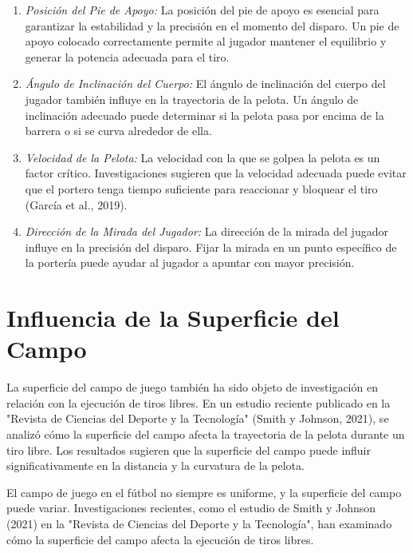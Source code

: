 \documentclass[
    a4paper,%
    DIV=calc,%
    abstract=true%
  ]{scrartcl}%
\begin{document}
  \begin{enumerate}
  \def\labelenumi{\arabic{enumi}.}
  \item
    \emph{Posición del Pie de Apoyo:} La posición del pie de apoyo es
    esencial para garantizar la estabilidad y la precisión en el momento
    del disparo. Un pie de apoyo colocado correctamente permite al
    jugador mantener el equilibrio y generar la potencia adecuada para
    el tiro.
  \item
    \emph{Ángulo de Inclinación del Cuerpo:} El ángulo de inclinación
    del cuerpo del jugador también influye en la trayectoria de la
    pelota. Un ángulo de inclinación adecuado puede determinar si la
    pelota pasa por encima de la barrera o si se curva alrededor de
    ella.
  \item
    \emph{Velocidad de la Pelota:} La velocidad con la que se golpea la
    pelota es un factor crítico. Investigaciones sugieren que la
    velocidad adecuada puede evitar que el portero tenga tiempo
    suficiente para reaccionar y bloquear el tiro (García et al., 2019).
  \item
    \emph{Dirección de la Mirada del Jugador:} La dirección de la mirada
    del jugador influye en la precisión del disparo. Fijar la mirada en
    un punto específico de la portería puede ayudar al jugador a apuntar
    con mayor precisión.
  \end{enumerate}

  \section{Influencia de la Superficie del
  Campo}\label{influencia-de-la-superficie-del-campo}

  La superficie del campo de juego también ha sido objeto de
  investigación en relación con la ejecución de tiros libres. En un
  estudio reciente publicado en la "Revista de Ciencias del Deporte y la
  Tecnología" (Smith y Johnson, 2021), se analizó cómo la superficie del
  campo afecta la trayectoria de la pelota durante un tiro libre. Los
  resultados sugieren que la superficie del campo puede influir
  significativamente en la distancia y la curvatura de la pelota.

  El campo de juego en el fútbol no siempre es uniforme, y la superficie
  del campo puede variar. Investigaciones recientes, como el estudio de
  Smith y Johnson (2021) en la "Revista de Ciencias del Deporte y la
  Tecnología", han examinado cómo la superficie del campo afecta la
  ejecución de tiros libres.
\end{document}
